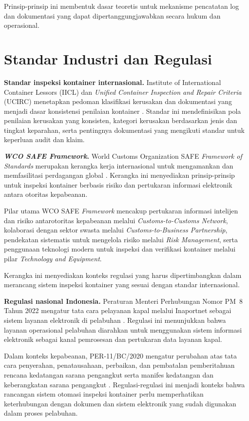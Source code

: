 Prinsip-prinsip ini membentuk dasar teoretis untuk mekanisme pencatatan log dan dokumentasi yang dapat dipertanggungjawabkan secara hukum dan operasional.

\section{Standar Industri dan Regulasi}

\textbf{Standar inspeksi kontainer internasional.}
Institute of International Container Lessors (IICL) dan \textit{Unified Container Inspection and Repair Criteria} (UCIRC) menetapkan pedoman klasifikasi kerusakan dan dokumentasi yang menjadi dasar konsistensi penilaian kontainer \autocite{iicl2016, icswsc2023}. Standar ini mendefinisikan pola penilaian kerusakan yang konsisten, kategori kerusakan berdasarkan jenis dan tingkat keparahan, serta pentingnya dokumentasi yang mengikuti standar untuk keperluan audit dan klaim.

\textbf{\textit{WCO SAFE Framework}.}
World Customs Organization SAFE \textit{Framework of Standards} merupakan kerangka kerja internasional untuk mengamankan dan memfasilitasi perdagangan global \autocite{wco2025}. Kerangka ini menyediakan prinsip-prinsip untuk inspeksi kontainer berbasis risiko dan pertukaran informasi elektronik antara otoritas kepabeanan.

Pilar utama WCO SAFE \textit{Framework} mencakup pertukaran informasi intelijen dan
risiko antarotoritas kepabeanan melalui \textit{Customs-to-Customs Network},
kolaborasi dengan sektor swasta melalui \textit{Customs-to-Business
Partnership}, pendekatan sistematis untuk mengelola risiko melalui \textit{Risk
Management}, serta penggunaan teknologi modern untuk inspeksi dan verifikasi
kontainer melalui pilar \textit{Technology and Equipment}.

Kerangka ini menyediakan konteks regulasi yang harus dipertimbangkan dalam merancang sistem inspeksi kontainer yang sesuai dengan standar internasional.

\textbf{Regulasi nasional Indonesia.}
Peraturan Menteri Perhubungan Nomor PM~8 Tahun 2022 mengatur tata cara
pelayanan kapal melalui Inaportnet sebagai sistem layanan elektronik di
pelabuhan \autocite{kemenhub2022}. Regulasi ini menunjukkan bahwa layanan
operasional pelabuhan diarahkan untuk menggunakan sistem informasi elektronik
sebagai kanal pemrosesan dan pertukaran data layanan kapal.

Dalam konteks kepabeanan, PER-11/BC/2020 mengatur perubahan atas tata cara
penyerahan, penatausahaan, perbaikan, dan pembatalan pemberitahuan rencana
kedatangan sarana pengangkut serta manifes kedatangan dan keberangkatan sarana
pengangkut \autocite{bc2020}. Regulasi-regulasi ini menjadi konteks bahwa
rancangan sistem otomasi inspeksi kontainer perlu memperhatikan keterhubungan
dengan dokumen dan sistem elektronik yang sudah digunakan dalam proses
pelabuhan.

